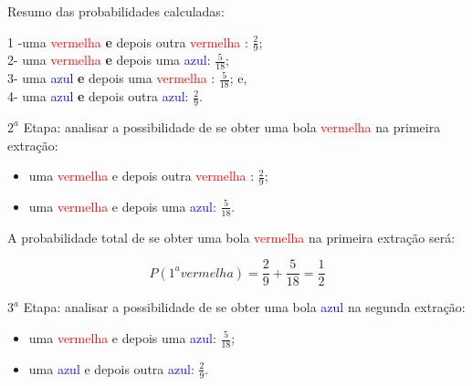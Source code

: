 \documentclass[
]{book}
\providecommand{\tightlist}{%
  \setlength{\itemsep}{0pt}\setlength{\parskip}{0pt}}
\begin{document}
\hfill\break

Resumo das probabilidades calculadas:

\hfill\break

1 -uma \textcolor{red}{vermelha} \textbf{e} depois outra \textcolor{red}{vermelha} : \(\frac{2}{9}\);\\
2- uma \textcolor{red}{vermelha} \textbf{e} depois uma \textcolor{blue}{azul}: \(\frac{5}{18}\);\\
3- uma \textcolor{blue}{azul} \textbf{e} depois uma \textcolor{red}{vermelha} : \(\frac{5}{18}\); e,\\
4- uma \textcolor{blue}{azul} \textbf{e} depois outra \textcolor{blue}{azul}: \(\frac{2}{9}\).

\hfill\break

\(2^{a}\) Etapa: analisar a possibilidade de se obter uma bola \textcolor{red}{vermelha} na primeira extração:

\hfill\break

\begin{itemize}
\tightlist
\item
  uma \textcolor{red}{vermelha} e depois outra \textcolor{red}{vermelha} : \(\frac{2}{9}\);\\
\item
  uma \textcolor{red}{vermelha} e depois uma \textcolor{blue}{azul}: \(\frac{5}{18}\).
\end{itemize}

\hfill\break

A probabilidade total de se obter uma bola \textcolor{red}{vermelha} na primeira extração será:

\hfill\break

\[
P(1^{a} vermelha)= \frac{2}{9} + \frac{5}{18} = \frac{1}{2}
\]

\hfill\break

\(3^{a}\) Etapa: analisar a possibilidade de se obter uma bola \textcolor{blue}{azul} na segunda extração:

\hfill\break

\begin{itemize}
\tightlist
\item
  uma \textcolor{red}{vermelha} e depois uma \textcolor{blue}{azul}: \(\frac{5}{18}\);\\
\item
  uma \textcolor{blue}{azul} e depois outra \textcolor{blue}{azul}: \(\frac{2}{9}\).
\end{itemize}

\hfill\break
\end{document}
